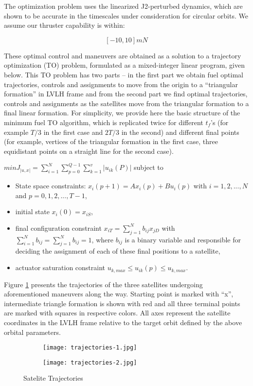The optimization problem uses the linearized J2-perturbed dynamics,
which are shown to be accurate in the timescales under consideration
for circular orbits. We assume our thruster capability is within:

\[[-10, 10] mN\]

These optimal control and maneuvers are obtained as a solution to a
trajectory optimization (TO) problem, formulated as a mixed-integer
linear program, given below. This TO problem has two parts – in the
first part we obtain fuel optimal trajectories, controls and
assignments to move from the origin to a ``triangular formation'' in
LVLH frame and from the second part we find optimal trajectories,
controls and assignments as the satellites move from the triangular
formation to a final linear formation. For simplicity, we provide here
the basic structure of the minimum fuel TO algorithm, which is
replicated twice for different $t_f$'s (for example $T/3$ in the first
case and $2T/3$ in the second) and different final points (for
example, vertices of the triangular formation in the first case, three
equidistant points on a straight line for the second case).

$min J_{|u,x|} = \sum_{i=1}^{N} \sum_{p=0}^{Q-1} \sum_{k=1}^{v} | u_{ik} (P)|$
subject to
\begin{itemize}
\item State space constraints:
  $x_i(p+1) = Ax_i(p)+Bu_i(p)$ with $i = 1,2,...,N$ and $p = 0,1,2,...,T-1$,
\item initial state $x_i(0) = x_{iS}$,
\item final configuration constraint
  $x_{iT} = \sum_{j=1}^{N}b_{ij}x_{jD}$
  with $\sum_{i=1}^{N}b_{ij} = \sum_{j=1}^{N}b_{ij} = 1$,
  where $b_{ij}$
  is a binary variable and responsible for deciding the assignment of
  each of these final positions to a satellite,
\item actuator saturation constraint $u_{k,max} \leq u_{ik}(p) \leq u_{k,max}$.
\end{itemize}

Figure \ref{fig:trajectories} presents the trajectories of the three
satellites undergoing aforementioned maneuvers along the way. Starting
point is marked with ``x'', intermediate triangle formation is shown
with red and all three terminal points are marked with squares in
respective colors. All axes represent the satellite coordinates in the
LVLH frame relative to the target orbit defined by the above orbital
parameters.

\begin{figure}
\centering

\begin{subfigure}{0.4\textwidth}
\texttt{[image: trajectories-1.jpg]}
\end{subfigure}

\hfill

\begin{subfigure}{0.4\textwidth}
\texttt{[image: trajectories-2.jpg]}
\end{subfigure}

\caption{Satelite Trajectories}
\label{fig:trajectories}
\end{figure}

